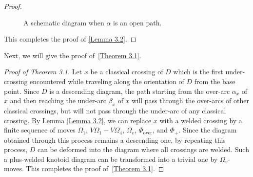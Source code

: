 \documentclass[11pt]{amsart}
\theoremstyle{noparens}
\numberwithin{equation}{section}
\numberwithin{equation}{section}
\begin{document}
\begin{proof}
\begin{figure}[htbp]
\caption{A schematic diagram when $\alpha$ is an open path.}
\label{Figure 15}
\end{figure}

This completes the proof of \cref{Lemma 3.2}.
\end{proof}

Next, we will give the proof of~\cref{Theorem 3.1}.

\begin{proof}[Proof of Theorem 3.1]
Let $x$ be a classical crossing of $D$ which is the first under-crossing encountered while traveling along the orientation of $D$ from the base point.
Since $D$ is a descending diagram, the path starting from the over-arc $\alpha_x$ of $x$ and then reaching the under-arc $\beta_x$ of $x$  will pass through the over-arcs of other classical crossings, but will not pass through the under-arc of any classical crossing.
By Lemma \autoref{Lemma 3.2}, we can replace $x$ with a welded crossing by a finite sequence of moves $\Omega_{1}$, $V\Omega_1 - V\Omega_4$, $\Omega_v$, $\Phi_{\text{over}}$, and $\Phi_+$. Since the diagram obtained through this process remains a descending one, by repeating this process, $D$ can be deformed into the diagram where all crossings are welded. Such a plus-welded knotoid diagram can be transformed into a trivial one by $\Omega_v$-moves. 
This completes the proof of~\cref{Theorem 3.1}.
\end{proof}
\end{document}
